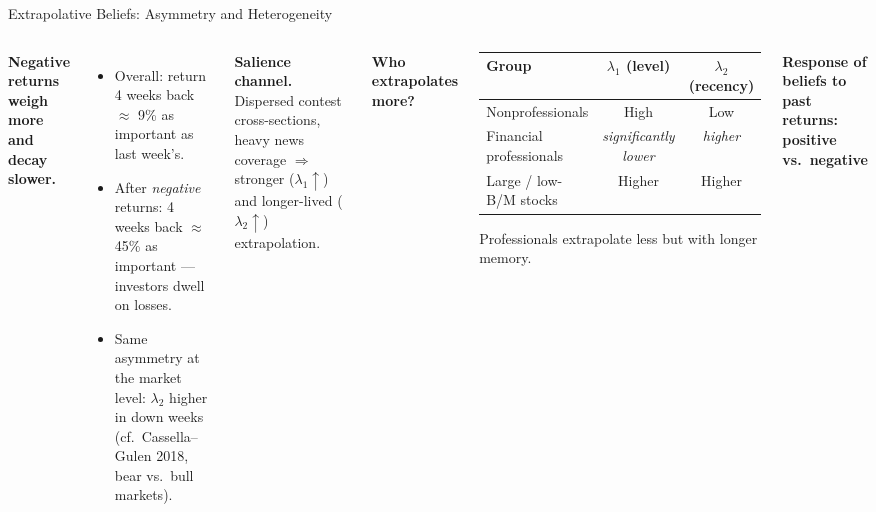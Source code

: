 \documentclass[aspectratio=169, 11pt]{beamer}
\begin{document}
\begin{frame}[shrink=16]{Extrapolative Beliefs: Asymmetry and Heterogeneity}
\begin{columns}[T]
\textbf{Negative returns weigh more and decay slower.}
\begin{itemize}
  \item Overall: return 4 weeks back $\approx$ 9\% as important as last week's.
  \item After \emph{negative} returns: 4 weeks back $\approx$ 45\% as important --- investors dwell on losses.
  \item Same asymmetry at the market level: $\lambda_2$ higher in down weeks (cf.\ Cassella--Gulen 2018, bear vs.\ bull markets).
\end{itemize}

\vspace{0.6em}
\textbf{Salience channel.} Dispersed contest cross-sections, heavy news coverage $\Rightarrow$ stronger ($\lambda_1\uparrow$) and longer-lived ($\lambda_2\uparrow$) extrapolation.

\vspace{0.6em}
\textbf{Who extrapolates more?}
\begin{center}
\small
\begin{tabular}{@{}lcc@{}}
\toprule
Group & $\lambda_1$ (level) & $\lambda_2$ (recency)\\
\midrule
Nonprofessionals & High & Low \\
Financial professionals & \emph{significantly lower} & \emph{higher} \\
Large / low-B/M stocks & Higher & Higher \\
\bottomrule
\end{tabular}

\vspace{2pt}
{\scriptsize Professionals extrapolate less but with longer memory.}
\end{center}

\centering
\textbf{Response of beliefs to past returns: positive vs.\ negative}\\[0.3em]


\end{columns}
\end{frame}
\end{document}
